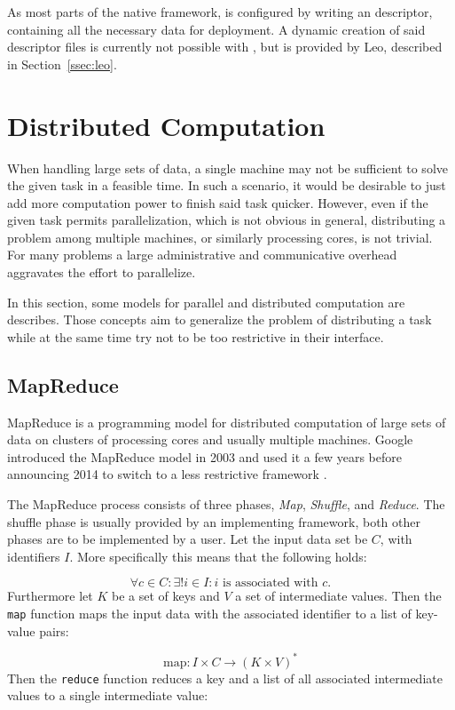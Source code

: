 As most parts of the native \uima{} framework, \uimaas{} is configured by writing an \xml{} descriptor, containing all the necessary data for deployment. A dynamic creation of said descriptor files is currently not possible with \uimafit{}, but is provided by Leo, described in Section~\ref{ssec:leo}.

\section{Distributed Computation}
\label{sec:dist_comp}
When handling large sets of data, a single machine may not be sufficient to solve the given task in a feasible time. In such a scenario, it would be desirable to just add more computation power to finish said task quicker. However, even if the given task permits parallelization, which is not obvious in general, distributing a problem among multiple machines, or similarly processing cores, is not trivial. For many problems a large administrative and communicative overhead aggravates the effort to parallelize.

In this section, some models for parallel and distributed computation are describes. Those concepts aim to generalize the problem of distributing a task while at the same time try not to be too restrictive in their interface. 

\subsection{MapReduce}
MapReduce is a programming model for distributed computation of large sets of data on clusters of processing cores and usually multiple machines. Google introduced the MapReduce model in 2003 and used it a few years before announcing 2014 to switch to a less restrictive framework \cite{dean2008mapreduce}.

The MapReduce process consists of three phases, \emph{Map}, \emph{Shuffle}, and \emph{Reduce}. The shuffle phase is usually provided by an implementing framework, both other phases are to be implemented by a user. Let the input data set be $C$, with identifiers $I$. More specifically this means that the following holds:

\[\forall{}c\in{}C:\exists!{}i\in{}I:i\text{ is associated with }c.\]
Furthermore let $K$ be a set of keys and $V$ a set of intermediate values. Then the \lstinline|map| function maps the input data with the associated identifier to a list of key-value pairs:

\[\text{map}:I\times{}C \rightarrow{} (K\times{}V)^*\]
Then the \lstinline|reduce| function reduces a key and a list of all associated intermediate values to a single intermediate value:

